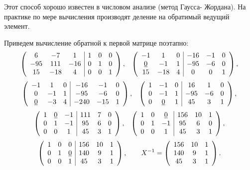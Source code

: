 {Этот способ хорошо известен в числовом анализе (метод Гаусса-\linebreak
Жордана). На практике по мере вычисления производят деление на
обратимый ведущий элемент.

Приведем вычисление обратной к первой матрице поэтапно:
\[ \left( \begin{array}{cccccc}
6 & -7 & 1 &   \multicolumn{1}{|c}{1} & 0 & 0 \\
-95 & 111 & -16 & \multicolumn{1}{|c}{0} & 1 & 0 \\
15 & -18 & 4 & \multicolumn{1}{|c}{0} & 0 & 1
\end{array} \right),\;\;\;
\left( \begin{array}{cccccc}
-1 &  1 & 0 & \multicolumn{1}{|c}{-16} & -1 & 0 \\
\underline{0} & -1 & 1 & \multicolumn{1}{|c}{-95} & -6 & 0 \\
15 & -18 & 4 &\multicolumn{1}{|c}{0} & 0 & 1
\end{array} \right), \]
\[ \left( \begin{array}{cccccc}
-1 &  1 & 0 & \multicolumn{1}{|c}{-16} & -1 & 0 \\
0 & -1 & 1 & \multicolumn{1}{|c}{-95} & -6 & 0 \\
\underline{0} & -3 & 4 & \multicolumn{1}{|c}{-240} & -15 & 1
\end{array} \right),\;\;\;
\left( \begin{array}{cccccc}
1 & -1 & 0 & \multicolumn{1}{|c}{16} & 1 & 0 \\
0 & -1 & 1 & \multicolumn{1}{|c}{-95} & -6 & 0 \\
0 & \underline{0} & 1 & \multicolumn{1}{|c}{45} & 3 & 1
\end{array} \right), \]
\[ \left( \begin{array}{cccccc}
1 & \underline{0} & -1 & \multicolumn{1}{|c}{111} & 7 & 0 \\
0 & 1 & -1 & \multicolumn{1}{|c}{95} & 6 & 0 \\
0 & 0 & 1 & \multicolumn{1}{|c}{45} & 3 & 1
\end{array} \right),\;\;\;
\left( \begin{array}{cccccc}
1 &  0 & \underline{0} & \multicolumn{1}{|c}{156} & 10 & 1 \\
0 & 1 & -1 & \multicolumn{1}{|c}{95} & 6 & 0 \\
0 & 0 & 1 & \multicolumn{1}{|c}{45} & 3 & 1
\end{array} \right), \]
\[ \left( \begin{array}{cccccc}
1 &  0 & 0 & \multicolumn{1}{|c}{156} & 10 & 1 \\
0 & 1 & \underline{0} & \multicolumn{1}{|c}{140} & 9 & 1 \\
0 & 0 & 1 & \multicolumn{1}{|c}{45} & 3 & 1
\end{array} \right),\qquad
X^{-1} = {\left( \begin{array}{ccc}
156 & 10 & 1 \\
140 & 9 & 1  \\
45 & 3 & 1
\end{array} \right).} \]

}
